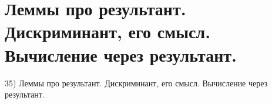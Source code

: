 \section{
 Леммы про результант. Дискриминант, его смысл. Вычисление через результант.
}

35) Леммы про результант. Дискриминант, его смысл. Вычисление через результант.
